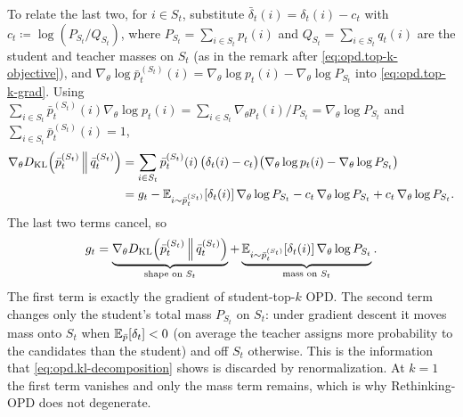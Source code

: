 To relate the last two, for $i\in S_t$, substitute
$\bar\delta_t(i)=\delta_t(i)-c_t$ with $c_t\coloneqq\log(P_{S_t}/Q_{S_t})$, where
$P_{S_t}=\sum_{i\in S_t}p_t(i)$ and $Q_{S_t}=\sum_{i\in S_t}q_t(i)$ are the student and teacher
masses on $S_t$ (as in the remark after \eqref{eq:opd.top-k-objective}), and
$\nabla_\theta\log\bar p_t^{(S_t)}(i)=\nabla_\theta\log p_t(i)-\nabla_\theta\log P_{S_t}$ into
\eqref{eq:opd.top-k-grad}. Using
$\sum_{i\in S_t}\bar p_t^{(S_t)}(i)\nabla_\theta\log p_t(i)=\sum_{i\in S_t}\nabla_\theta p_t(i)/P_{S_t}=\nabla_\theta\log P_{S_t}$
and $\sum_{i\in S_t}\bar p_t^{(S_t)}(i)=1$,
\begin{align*}
    \nabla_\theta D_{\mathrm{KL}}\!\left(\bar p_t^{(S_t)}\,\middle\|\,\bar q_t^{(S_t)}\right)
    &=
    \sum_{i\in S_t}\bar p_t^{(S_t)}(i)\,\big(\delta_t(i)-c_t\big)
    \big(\nabla_\theta\log p_t(i)-\nabla_\theta\log P_{S_t}\big)
    \\
    &=
    g_t
    -
    \mathbb{E}_{i\sim\bar p_t^{(S_t)}}\!\left[\delta_t(i)\right]\nabla_\theta\log P_{S_t}
    -
    c_t\,\nabla_\theta\log P_{S_t}
    +
    c_t\,\nabla_\theta\log P_{S_t}.
\end{align*}
The last two terms cancel, so
\begin{align}
    g_t
    =
    \underbrace{
    \nabla_\theta D_{\mathrm{KL}}\!\left(\bar p_t^{(S_t)}\,\middle\|\,\bar q_t^{(S_t)}\right)
    }_{\text{shape on } S_t}
    +
    \underbrace{
    \mathbb{E}_{i\sim\bar p_t^{(S_t)}}\!\left[\delta_t(i)\right]\nabla_\theta\log P_{S_t}
    }_{\text{mass on } S_t}.
    \label{eq:opd.rethinking-vs-topk}
\end{align}
The first term is exactly the gradient of student-top-$k$ OPD. The second term changes only the
student's total mass $P_{S_t}$ on $S_t$: under gradient descent it moves mass onto $S_t$ when
$\mathbb{E}_{\bar p}[\delta_t]<0$ (on average the teacher assigns more probability to the candidates
than the student) and off $S_t$ otherwise. This is the information that
\eqref{eq:opd.kl-decomposition} shows is discarded by renormalization. At $k=1$ the first term
vanishes and only the mass term remains, which is why Rethinking-OPD does not degenerate.

